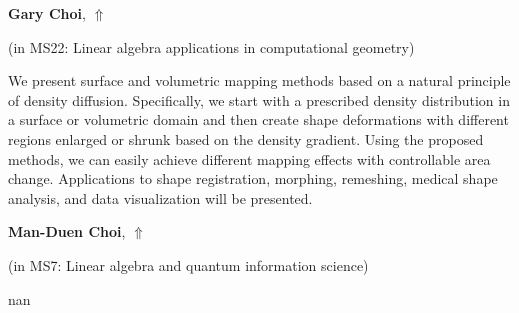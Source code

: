 \documentclass[ILAS2025-program.tex]{subfiles}
\begin{document}
\hypertarget{down0034}{}\begin{ilasabstract}
    
\textbf{Gary Choi},  \hfill \hyperlink{up0034}{$\Uparrow$}
    
    
(in {\color{mstitle}MS22: Linear algebra applications in computational geometry})
        
\mtskip
    We present surface and volumetric mapping methods based on a natural principle of density diffusion. Specifically, we start with a prescribed density distribution in a surface or volumetric domain and then create shape deformations with different regions enlarged or shrunk based on the density gradient. Using the proposed methods, we can easily achieve different mapping effects with controllable area change. Applications to shape registration, morphing, remeshing, medical shape analysis, and data visualization will be presented. 

\end{ilasabstract}
    

\hypertarget{down0205}{}\begin{ilasabstract}
    
\textbf{Man-Duen Choi},  \hfill \hyperlink{up0205}{$\Uparrow$}
    
    
(in {\color{mstitle}MS7: Linear algebra and quantum information science})
        
\mtskip
    nan
\end{ilasabstract}
    
\end{document}

